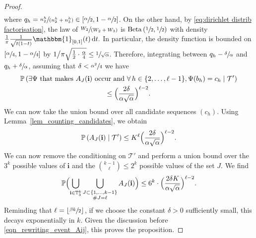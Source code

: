 \documentclass[JEP,XML,SOM,Unicode,NoFloatCountersInSection,published]{cedram}
\newcommand{\spfrac}[2]{\sfrac{#1}{(#2)}}
\newcommand{\bsfrac}[2]{{#1}\big/{#2}}
\newcommand{\BPp}[1]{\mathbb{P} \Bigl(#1\Bigr)}
\newcommand{\Ppsq}[2]{\mathbb{P} \left(#1\mathrel{}\middle|\mathrel{}#2\right)}
\newcommand{\ii}{\mathbf{i}}
\theoremstyle{plain}
\theoremstyle{definition}
\begin{document}
\begin{proof}
\begin{multline*}
\end{multline*}
where $q_h=\spfrac{n^{h}_2}{n^{h}_2+n^{h}_3} \in \left[ \sfrac{\alpha}{2}, 1-\sfrac{\alpha}{2} \right]$.
On the other hand, by \eqref{eq:dirichlet distrib factorisation}, the law of $\spfrac{W_2}{W_2+W_3}$ is $\mathrm{Beta}\left(\sfrac{1}{2},\sfrac{1}{2}\right)$
with density
\(\frac{1}{\pi} \frac{1}{\sqrt{t(1-t)}} \mathbbm{1}_{[0,1]}(t) \, \mathrm{d}t.\)
In particular, the density function is bounded on $\left[ \sfrac{\alpha}{4}, 1-\sfrac{\alpha}{4} \right]$ by $\bsfrac{1}{\pi \sqrt{ \frac{1}{2} \cdot \frac{\alpha}{4}}}\leq \sfrac{1}{\sqrt{\alpha}}$.
Therefore, integrating between $q_h-\sfrac{\delta}{\alpha}$ and $q_h+\sfrac{\delta}{\alpha}$, assuming that $\delta<\sfrac{\alpha^2}{4}$ we have
\begin{multline*}
\Ppsq{\exists \Psi \text{ that makes $A_J(\ii)$ occur and }\forall \, h\in\{2,\dots,\ell-1\}, \Psi(b_h)=c_h}{ \mathcal{T'}} \\ \leq \Bigl( \frac{2\delta}{\alpha\sqrt{\alpha}} \Bigr)^{\ell-2}.
\end{multline*}
We can now take the union bound over all candidate sequences $(c_h)$. Using Lemma~\ref{lem_counting_candidates}, we obtain
\[ \Ppsq{A_J(\ii)}{ \mathcal{T'}} \leq K^{\ell} \Bigl( \frac{2\delta}{\alpha\sqrt{\alpha}} \Bigr)^{\ell-2}.\]
We can now remove the conditioning on $\mathcal{T'}$ and perform a union bound over the $3^k$ possible values of $\ii$ and the $\binom{k-1}{\ell} \leq 2^k$ possible values of the set $J$.
We find
\begin{equation}\label{eq:how small delta has to be}
\BPp{\bigcup_{\ii\in \mathbb{T}_3^k} \bigcup_{\substack{J \subset \{1,\dots,k-1\}\\ \#J=\ell}} A_J(\ii)} \leq 6 ^k \cdot \Bigl( \frac{2\delta K}{\alpha\sqrt{\alpha}} \Bigr)^{\ell-2}.
\end{equation}
Reminding that $\ell=\lfloor\sfrac{\beta k}{2}\rfloor$, if we choose the constant $\delta>0$ sufficiently small, this decays exponentially in $k$.
Given the discussion before \eqref{eqn_rewriting_event_Aij}, this proves the proposition.
\end{proof}
\end{document}
